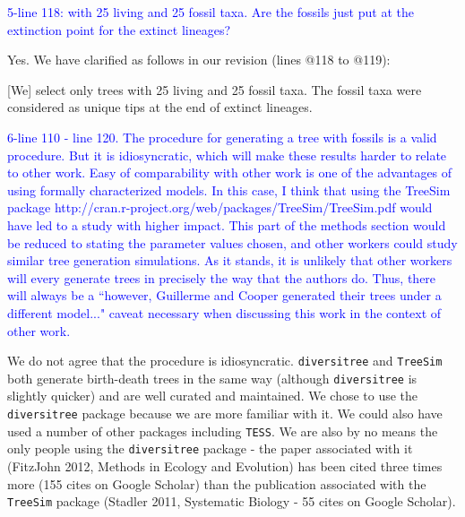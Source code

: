 \documentclass[11pt]{letter}
\begin{document}
\begin{letter}{}
\textcolor{blue}{5-line 118: with 25 living and 25 fossil taxa. Are the fossils just put at the extinction point for the extinct lineages?}

Yes. We have clarified as follows in our revision (lines @118 to @119):

\hfill\begin{minipage}{\dimexpr\textwidth-1cm}
[We] select only trees with 25 living and 25 fossil taxa. The fossil taxa were considered as unique tips at the end of extinct lineages.
\end{minipage}


\textcolor{blue}{6-line 110 - line 120. The procedure for generating a tree with fossils is a valid procedure. But it is idiosyncratic, which will make these results harder to relate to other work. Easy of comparability with other work is one of the advantages of using formally characterized models. In this case, I think that using the TreeSim package http://cran.r-project.org/web/packages/TreeSim/TreeSim.pdf would have led to a study with higher impact. This part of the methods section would be reduced to stating the parameter values chosen, and other workers could study similar tree generation simulations. As it stands, it is unlikely that other workers will every generate trees in precisely the way that the authors do. Thus, there will always be a ``however, Guillerme and Cooper generated their trees under a different model..." caveat necessary when discussing this work in the context of other work.}

We do not agree that the procedure is idiosyncratic. \texttt{diversitree} and \texttt{TreeSim} both generate birth-death trees in the same way (although \texttt{diversitree} is slightly quicker) and are well curated and maintained. We chose to use the \texttt{diversitree} package because we are more familiar with it. We could also have used a number of other packages including \texttt{TESS}. We are also by no means the only people using the \texttt{diversitree} package - the paper associated with it (FitzJohn 2012, Methods in Ecology and Evolution) has been cited three times more (155 cites on Google Scholar) than the publication associated with the \texttt{TreeSim} package (Stadler 2011, Systematic Biology - 55 cites on Google Scholar).


\end{letter}
\end{document}

